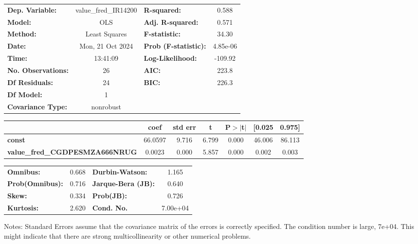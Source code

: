 \begin{center}
\begin{tabular}{lclc}
\toprule
\textbf{Dep. Variable:}                & value\_fred\_IR14200 & \textbf{  R-squared:         } &     0.588   \\
\textbf{Model:}                        &         OLS          & \textbf{  Adj. R-squared:    } &     0.571   \\
\textbf{Method:}                       &    Least Squares     & \textbf{  F-statistic:       } &     34.30   \\
\textbf{Date:}                         &   Mon, 21 Oct 2024   & \textbf{  Prob (F-statistic):} &  4.85e-06   \\
\textbf{Time:}                         &       13:41:09       & \textbf{  Log-Likelihood:    } &   -109.92   \\
\textbf{No. Observations:}             &            26        & \textbf{  AIC:               } &     223.8   \\
\textbf{Df Residuals:}                 &            24        & \textbf{  BIC:               } &     226.3   \\
\textbf{Df Model:}                     &             1        & \textbf{                     } &             \\
\textbf{Covariance Type:}              &      nonrobust       & \textbf{                     } &             \\
\bottomrule
\end{tabular}
\begin{tabular}{lcccccc}
                                       & \textbf{coef} & \textbf{std err} & \textbf{t} & \textbf{P$> |$t$|$} & \textbf{[0.025} & \textbf{0.975]}  \\
\midrule
\textbf{const}                         &      66.0597  &        9.716     &     6.799  &         0.000        &       46.006    &       86.113     \\
\textbf{value\_fred\_CGDPESMZA666NRUG} &       0.0023  &        0.000     &     5.857  &         0.000        &        0.002    &        0.003     \\
\bottomrule
\end{tabular}
\begin{tabular}{lclc}
\textbf{Omnibus:}       &  0.668 & \textbf{  Durbin-Watson:     } &    1.165  \\
\textbf{Prob(Omnibus):} &  0.716 & \textbf{  Jarque-Bera (JB):  } &    0.640  \\
\textbf{Skew:}          &  0.334 & \textbf{  Prob(JB):          } &    0.726  \\
\textbf{Kurtosis:}      &  2.620 & \textbf{  Cond. No.          } & 7.00e+04  \\
\bottomrule
\end{tabular}
\end{center}

Notes: \newline
 [1] Standard Errors assume that the covariance matrix of the errors is correctly specified. \newline
 [2] The condition number is large,  7e+04. This might indicate that there are \newline
 strong multicollinearity or other numerical problems.